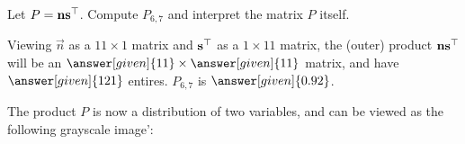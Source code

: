 \documentclass{ximera}
\begin{document}
\begin{example}[Distributions]
\begin{center}
  \end{center}
  Let $P = \mathbf{n}\mathbf{s}^\top$. Compute $P_{6,7}$ and interpret
  the matrix $P$ itself.
  \begin{explanation}
    Viewing $\vec{n}$ as a $11\times 1$ matrix and
    $\mathbf{s}^\top$ as a $1 \times 11$ matrix, the (outer) product
    $\mathbf{n}\mathbf{s}^\top$ will be an
    $\answer[given]{11}\times\answer[given]{11}$ matrix, and have
    $\answer[given]{121}$ entires. $P_{6,7}$ is
    $\answer[given]{0.92}$.

    The product $P$ is now a distribution of two variables, and can be
    viewed as the following grayscale image':
    \begin{center}
      \newcommand{\matrixData}{{
          {0,0,0.01,0.03,0.07,0.11,0.13,0.1,0.06,0.03,0.01},
          {0,0,0.02,0.06,0.13,0.22,0.25,0.21,0.13,0.06,0.02},
          {0,0,0.03,0.1,0.24,0.39,0.45,0.37,0.22,0.1,0.04},
          {0,0.01,0.04,0.15,0.35,0.58,0.67,0.55,0.33,0.15,0.05},
          {0,0.01,0.05,0.19,0.45,0.74,0.85,0.7,0.42,0.19,0.07},
          {0,0.01,0.06,0.21,0.49,0.8,0.92,0.76,0.46,0.21,0.07},
          {0,0.01,0.05,0.19,0.45,0.74,0.85,0.7,0.42,0.19,0.07},
          {0,0.01,0.04,0.15,0.35,0.58,0.67,0.55,0.33,0.15,0.05},
          {0,0,0.03,0.1,0.24,0.39,0.45,0.37,0.22,0.1,0.04},
          {0,0,0.02,0.06,0.13,0.22,0.25,0.21,0.13,0.06,0.02},
          {0,0,0.01,0.03,0.07,0.11,0.13,0.1,0.06,0.03,0.01}
      }}
      \newcommand{\skewData}{{
           {0., 0.01, 0.07, 0.26, 0.61, 1., 1.15, 0.95, 0.57, 0.26, 0.09}
      }}
      \newcommand{\normData}{{
          {0.11, 0.22, 0.39, 0.58, 0.74, 0.8, 0.74, 0.58, 0.39, 0.22, 0.11}
      }}
\end{center}
\end{explanation}
\end{example}
\end{document}

